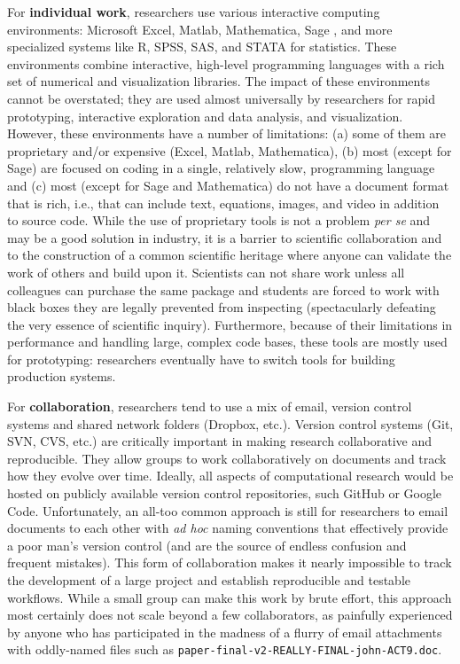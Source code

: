 \documentclass[ChapterTOCs,krantz2]{krantz} %
\begin{document}
For \textbf{individual work}, researchers use various interactive
computing environments: Microsoft Excel, Matlab, Mathematica\textregistered,
Sage \cite{sage}, and more specialized systems like R, SPSS, SAS, and STATA for
statistics. These environments combine interactive, high-level programming
languages with a rich set of numerical and visualization libraries. The impact
of these environments cannot be overstated; they are used almost universally by
researchers for rapid prototyping, interactive exploration and data analysis,
and visualization. However, these environments have a number of limitations:
(a) some of them are proprietary and/or expensive (Excel, Matlab, Mathematica),
(b) most (except for Sage) are focused on coding in a single, relatively slow,
programming language and (c) most (except for Sage and Mathematica) do not have
a document format that is rich, i.e., that can include text, equations, images,
and video in addition to source code. While the use of proprietary tools is not
a problem \emph{per se} and may be a good solution in industry, it is a barrier
to scientific collaboration and to the construction of a common scientific
heritage where anyone can validate the work of others and build upon it.
Scientists can not share work unless all colleagues can purchase the same
package and students are forced to work with black boxes they are legally
prevented from inspecting (spectacularly defeating the very essence of
scientific inquiry). Furthermore, because of their limitations in performance
and handling large, complex code bases, these tools are mostly used for
prototyping: researchers eventually have to switch tools for building
production systems.

For \textbf{collaboration}, researchers tend to use a mix of email, version
control systems and shared network folders (Dropbox, etc.).  Version control
systems (Git, SVN, CVS, etc.) are critically important in making research
collaborative and reproducible. They allow groups to work collaboratively on
documents and track how they evolve over time. Ideally, all aspects of
computational research would be hosted on publicly available version control
repositories, such GitHub or Google Code. Unfortunately, an all-too common
approach is still for researchers to email documents to each other with
\emph{ad hoc} naming conventions that effectively provide a poor man's version
control (and are the source of endless confusion and frequent mistakes). This
form of collaboration makes it nearly impossible to track the development of a
large project and establish reproducible and testable workflows.  While a
small group can make this work by brute effort, this approach most certainly
does not scale beyond a few collaborators, as painfully experienced by anyone
who has participated in the madness of a flurry of email attachments with
oddly-named files such as {\tt paper-final-v2-REALLY-FINAL-john-ACT9.doc}.
\end{document}
